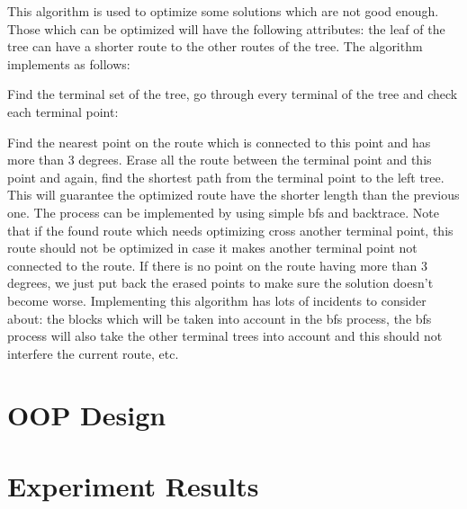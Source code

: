 \documentclass[12pt, a4paper]{article}
\begin{document}
		This algorithm is used to optimize some solutions which are not good enough. Those which can be optimized will have the following attributes: the leaf of the tree can have a shorter route to the other routes of the tree. The algorithm implements as follows:
		
		Find the terminal set of the tree, go through every terminal of the tree and check each terminal point:
			
			Find the nearest point on the route which is connected to this point and has more than 3 degrees. Erase all the route between the terminal point and this point and again, find the shortest path from the terminal point to the left tree. This will guarantee the optimized route have the shorter length than the previous one. The process can be implemented by using simple bfs and backtrace. Note that if the found route which needs optimizing cross another terminal point, this route should not be optimized in case it makes another terminal point not connected to the route. If there is no point on the route having more than 3 degrees, we just put back the erased points to make sure the solution doesn't become worse. Implementing this algorithm has lots of incidents to consider about: the blocks which will be taken into account in the bfs process, the bfs process will also take the other terminal trees into account and this should not interfere the current route, etc.
	
	\section{OOP Design}
	
	\section{Experiment Results}
\end{document}

